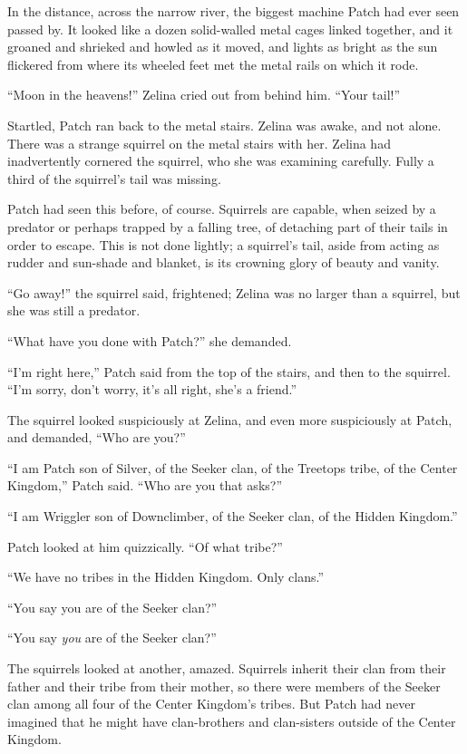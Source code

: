 \documentclass[12pt]{memoir}
\begin{document}
In the distance, across the narrow river, the biggest machine Patch
had ever seen passed by. It looked like a dozen solid-walled metal
cages linked together, and it groaned and shrieked and howled as it
moved, and lights as bright as the sun flickered from where its
wheeled feet met the metal rails on which it rode.

“Moon in the heavens!” Zelina cried out from behind him. “Your tail!”

Startled, Patch ran back to the metal stairs. Zelina was awake, and
not alone. There was a strange squirrel on the metal stairs with
her. Zelina had inadvertently cornered the squirrel, who she was
examining carefully. Fully a third of the squirrel’s tail was missing.

Patch had seen this before, of course. Squirrels are capable, when
seized by a predator or perhaps trapped by a falling tree, of
detaching part of their tails in order to escape. This is not done
lightly; a squirrel’s tail, aside from acting as rudder and sun-shade
and blanket, is its crowning glory of beauty and vanity.

“Go away!” the squirrel said, frightened; Zelina was no larger than a
squirrel, but she was still a predator.

“What have you done with Patch?” she demanded.

“I’m right here,” Patch said from the top of the stairs, and then to
the squirrel. “I’m sorry, don’t worry, it’s all right, she’s a
friend.”

The squirrel looked suspiciously at Zelina, and even more suspiciously
at Patch, and demanded, “Who are you?”

“I am Patch son of Silver, of the Seeker clan, of the Treetops tribe,
of the Center Kingdom,” Patch said. “Who are you that asks?”

“I am Wriggler son of Downclimber, of the Seeker clan, of the Hidden
Kingdom.”

Patch looked at him quizzically. “Of what tribe?”

“We have no tribes in the Hidden Kingdom. Only clans.”

“You say you are of the Seeker clan?”

“You say \textit{you} are of the Seeker clan?”

The squirrels looked at another, amazed. Squirrels inherit their clan
from their father and their tribe from their mother, so there were
members of the Seeker clan among all four of the Center Kingdom’s
tribes. But Patch had never imagined that he might have clan-brothers
and clan-sisters outside of the Center Kingdom.
\end{document}
